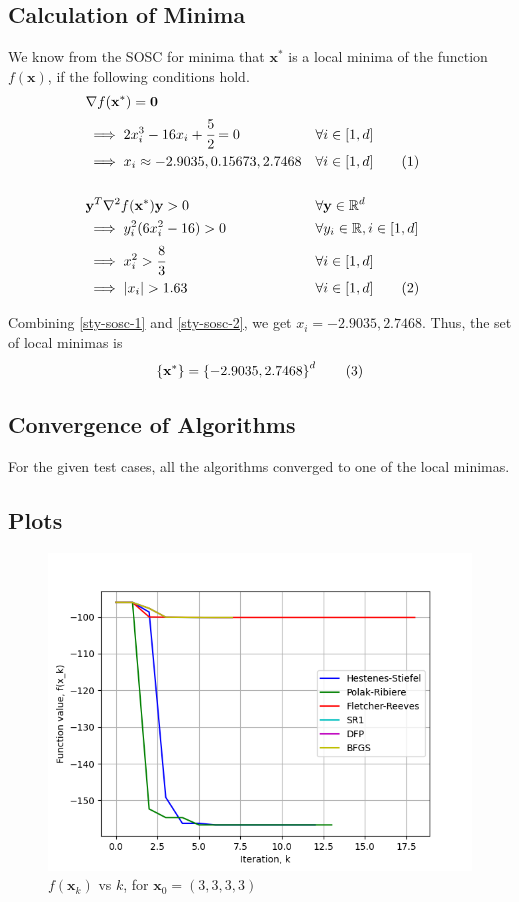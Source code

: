 \documentclass[a4paper]{article}
\newcommand\numberthis{\addtocounter{equation}{1}\tag{\theequation}}
\begin{document}
\subsection{Calculation of Minima}

We know from the SOSC for minima that $\textbf{x}^*$ is a local minima of the function $f(\textbf{x})$, if the following conditions hold.
\begin{align*}
&\nabla f(\textbf{x}^*) = \textbf{0} \\
&\implies 2 x_i^3 - 16 x_i + \cfrac{5}{2} = 0 &&\forall i \in [1, d] \\
&\implies x_i \approx -2.9035, 0.15673, 2.7468 &&\forall i \in [1, d] \numberthis \label{sty-sosc-1} \\ \\
&\textbf{y}^T \nabla^2 f(\textbf{x}^*) \textbf{y} > 0 &&\forall \textbf{y} \in \mathbb{R}^d \\
&\implies y_i^2 (6 x_i^2 - 16) > 0 &&\forall y_i \in \mathbb{R}, i \in [1, d] \\
&\implies x_i^2 > \cfrac{8}{3} &&\forall i \in [1, d] \\
&\implies |x_i| > 1.63 &&\forall i \in [1, d] \numberthis \label{sty-sosc-2}
\end{align*}

Combining \eqref{sty-sosc-1} and \eqref{sty-sosc-2}, we get $x_i = -2.9035, 2.7468$. Thus, the set of local minimas is
\begin{align*}
\left\{\textbf{x}^*\right\} = \left\{-2.9035, 2.7468\right\}^d \numberthis \label{sty-minima}
\end{align*}

\subsection{Convergence of Algorithms}

For the given test cases, all the algorithms converged to one of the local minimas.

\subsection{Plots}

\begin{figure}[H]
    \centering
    \includegraphics[width=.65\textwidth]{images/styblinski_tang_function_vals.png}
    \caption{$f(\textbf{x}_k)$ vs $k$, for $\textbf{x}_0 = (3, 3, 3, 3)$}
\end{figure}
\end{document}
